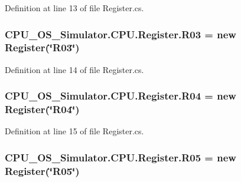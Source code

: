 Definition at line 13 of file Register.\+cs.

\hypertarget{class_c_p_u___o_s___simulator_1_1_c_p_u_1_1_register_a442530be904ccb54d0224eb441bccb27}{}
\subsubsection[{R03}]{ C\+P\+U\+\_\+\+O\+S\+\_\+\+Simulator.\+C\+P\+U.\+Register.\+R03 = new {\bf Register}(\char`\"{}R03\char`\"{})\hspace{0.3cm}{\ttfamily [static]}}\label{class_c_p_u___o_s___simulator_1_1_c_p_u_1_1_register_a442530be904ccb54d0224eb441bccb27}


Definition at line 14 of file Register.\+cs.

\hypertarget{class_c_p_u___o_s___simulator_1_1_c_p_u_1_1_register_aa86ab37f2ba652b534b8a6d4d338603e}{}
\subsubsection[{R04}]{ C\+P\+U\+\_\+\+O\+S\+\_\+\+Simulator.\+C\+P\+U.\+Register.\+R04 = new {\bf Register}(\char`\"{}R04\char`\"{})\hspace{0.3cm}{\ttfamily [static]}}\label{class_c_p_u___o_s___simulator_1_1_c_p_u_1_1_register_aa86ab37f2ba652b534b8a6d4d338603e}


Definition at line 15 of file Register.\+cs.

\hypertarget{class_c_p_u___o_s___simulator_1_1_c_p_u_1_1_register_a68c78defdae216e7110a284464e1ec64}{}
\subsubsection[{R05}]{ C\+P\+U\+\_\+\+O\+S\+\_\+\+Simulator.\+C\+P\+U.\+Register.\+R05 = new {\bf Register}(\char`\"{}R05\char`\"{})\hspace{0.3cm}{\ttfamily [static]}}\label{class_c_p_u___o_s___simulator_1_1_c_p_u_1_1_register_a68c78defdae216e7110a284464e1ec64}


